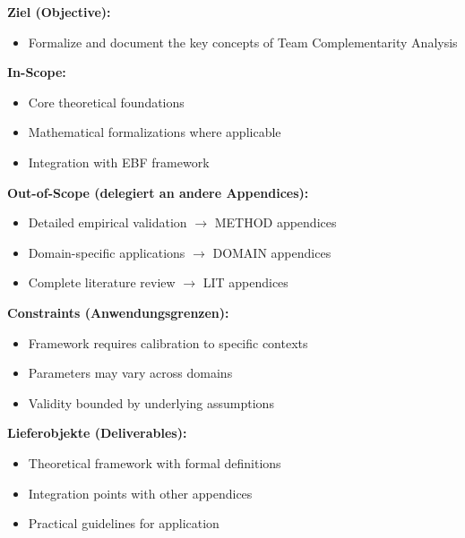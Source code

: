 
\begin{tcolorbox}[
    colback=orange!5!white,
    colframe=orange!75!black,
    title={\textbf{Appendix Scope: Ziel / In-Scope / Out-of-Scope / Constraints}},
    fonttitle=\bfseries
]

\textbf{Ziel (Objective):}
\begin{itemize}[nosep]
    \item Formalize and document the key concepts of Team Complementarity Analysis
\end{itemize}

\textbf{In-Scope:}
\begin{itemize}[nosep]
    \item Core theoretical foundations
    \item Mathematical formalizations where applicable
    \item Integration with EBF framework
\end{itemize}

\textbf{Out-of-Scope (delegiert an andere Appendices):}
\begin{itemize}[nosep]
    \item Detailed empirical validation $\rightarrow$ METHOD appendices
    \item Domain-specific applications $\rightarrow$ DOMAIN appendices
    \item Complete literature review $\rightarrow$ LIT appendices
\end{itemize}

\textbf{Constraints (Anwendungsgrenzen):}
\begin{itemize}[nosep]
    \item Framework requires calibration to specific contexts
    \item Parameters may vary across domains
    \item Validity bounded by underlying assumptions
\end{itemize}

\textbf{Lieferobjekte (Deliverables):}
\begin{itemize}[nosep]
    \item Theoretical framework with formal definitions
    \item Integration points with other appendices
    \item Practical guidelines for application
\end{itemize}

\end{tcolorbox}



